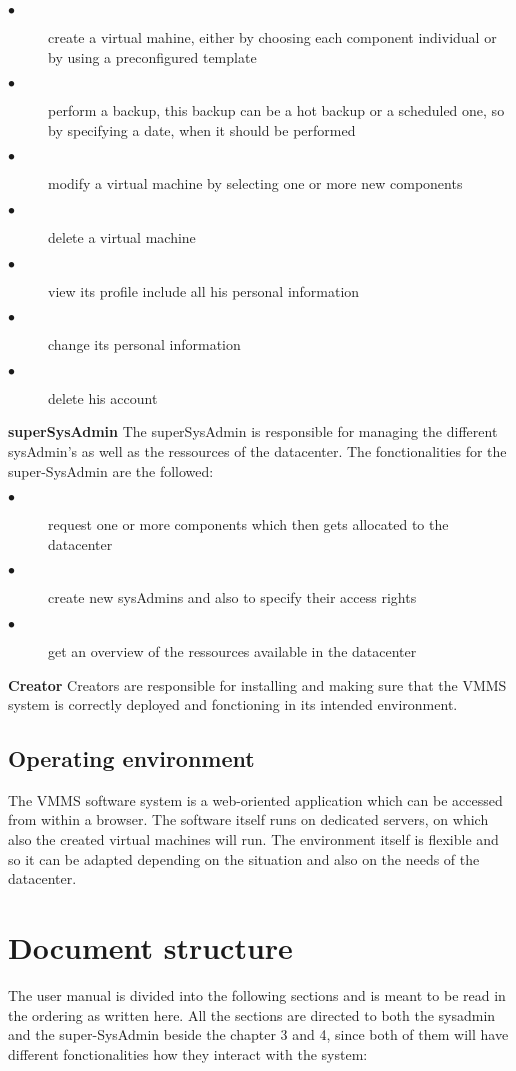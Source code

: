 \begin{description}
\item[$\bullet$] create a virtual mahine, either by choosing each component
individual or by using a preconfigured template
\item[$\bullet$] perform a backup, this backup can be a hot backup or a
scheduled one, so by specifying a date, when it should be performed
\item[$\bullet$] modify a virtual machine by selecting one or more new
components
\item[$\bullet$] delete a virtual machine
\item[$\bullet$] view its profile include all his personal information
\item[$\bullet$] change its personal information
\item[$\bullet$] delete his account
\end{description}
\textbf{superSysAdmin} The superSysAdmin is responsible for managing the
different sysAdmin's as well as the ressources of the datacenter. The
fonctionalities for the super-SysAdmin are the followed:
\begin{description}
\item[$\bullet$] request one or more components which then gets allocated to the
datacenter
\item[$\bullet$] create new sysAdmins and also to specify their access rights
\item[$\bullet$] get an overview of the ressources available in the datacenter
\end{description}

\textbf{Creator} Creators are responsible for installing and making sure that
the VMMS system is correctly deployed and fonctioning in its intended
environment.




\subsection{Operating environment}
The VMMS software system is a web-oriented application which can be accessed
from within a browser. The software itself runs on dedicated servers, on which also
the created virtual machines will run. The environment itself is flexible and so
it can be adapted depending on the situation and also on the needs of the datacenter.

\section{Document structure}  
The user manual is divided into the following sections and is meant to be read
in the ordering as written here. All the sections are directed to both the sysadmin
and the super-SysAdmin beside the chapter 3 and 4, since both of them will
have different fonctionalities how they interact with the system:\\\\

